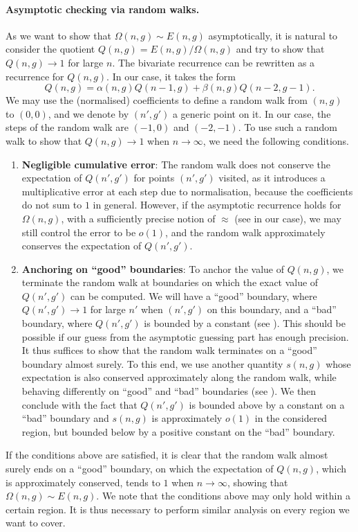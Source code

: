 \documentclass[a4paper,12pt]{article}
\theoremstyle{definition}
\begin{document}
\paragraph{\textbf{Asymptotic checking via random walks.}} As we want to show that $\Omega(n, g) \sim E(n, g)$ asymptotically, it is natural to consider the quotient $Q(n, g) = E(n, g) / \Omega(n, g)$ and try to show that $Q(n, g) \to 1$ for large $n$. The bivariate recurrence can be rewritten as a recurrence for $Q(n, g)$. In our case, it takes the form
\[
  Q(n, g) = \alpha(n, g) Q(n-1, g) + \beta(n, g) Q(n-2, g-1).
\]
We may use the (normalised) coefficients to define a random walk from $(n, g)$ to $(0, 0)$, and we denote by $(n', g')$ a generic point on it. In our case, the steps of the random walk are $(-1, 0)$ and $(-2, -1)$. To use such a random walk to show that $Q(n, g) \to 1$ when $n \to \infty$, we need the following conditions.
\begin{enumerate}
\item \textbf{Negligible cumulative error}: The random walk does not conserve the expectation of $Q(n', g')$ for points $(n', g')$ visited, as it introduces a multiplicative error at each step due to normalisation, because the coefficients do not sum to $1$ in general. However, if the asymptotic recurrence holds for $\Omega(n, g)$, with a sufficiently precise notion of $\approx$ (see  in our case), we may still control the error to be $o(1)$, and the random walk approximately conserves the expectation of $Q(n', g')$.
\item \textbf{Anchoring on ``good'' boundaries}: To anchor the value of $Q(n, g)$, we terminate the random walk at boundaries on which the exact value of $Q(n', g')$ can be computed. We will have a ``good'' boundary, where $Q(n', g') \to 1$ for large $n'$ when $(n', g')$ on this boundary, and a ``bad'' boundary, where $Q(n', g')$ is bounded by a constant (see ). This should be possible if our guess from the asymptotic guessing part has enough precision. It thus suffices to show that the random walk terminates on a ``good'' boundary almost surely. To this end, we use another quantity $s(n, g)$ whose expectation is also conserved approximately along the random walk, while behaving differently on ``good'' and ``bad'' boundaries (see ). We then conclude with the fact that $Q(n', g')$ is bounded above by a constant on a ``bad'' boundary and $s(n, g)$ is approximately $o(1)$ in the considered region, but bounded below by a positive constant on the ``bad'' boundary.
\end{enumerate}
If the conditions above are satisfied, it is clear that the random walk almost surely ends on a ``good'' boundary, on which the expectation of $Q(n, g)$, which is approximately conserved, tends to $1$ when $n \to \infty$, showing that $\Omega(n, g) \sim E(n, g)$. We note that the conditions above may only hold within a certain region. It is thus necessary to perform similar analysis on every region we want to cover.
\end{document}
